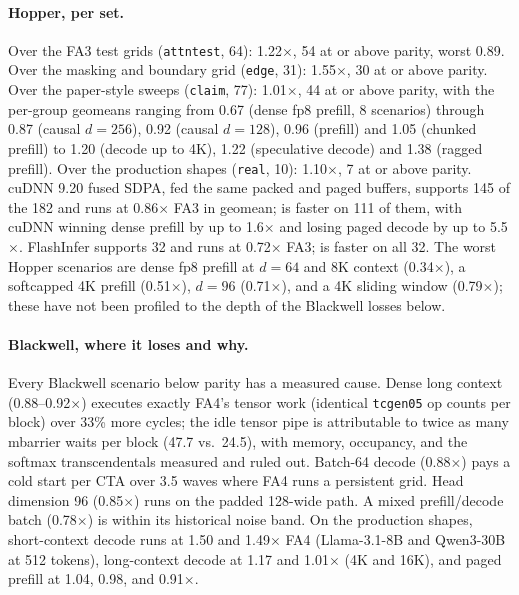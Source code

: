 \paragraph{Hopper, per set.} Over the FA3 test grids (\texttt{attntest}, 64): 1.22$\times$, 54 at
or above parity, worst 0.89. Over the masking and boundary grid (\texttt{edge}, 31): 1.55$\times$,
30 at or above parity. Over the paper-style sweeps (\texttt{claim}, 77): 1.01$\times$, 44 at or above
parity, with the per-group geomeans ranging from 0.67 (dense fp8 prefill, 8 scenarios) through 0.87
(causal $d=256$), 0.92 (causal $d=128$), 0.96 (prefill) and 1.05 (chunked prefill) to 1.20 (decode up
to 4K), 1.22 (speculative decode) and 1.38 (ragged prefill). Over the production shapes
(\texttt{real}, 10): 1.10$\times$, 7 at or above parity. cuDNN 9.20 fused SDPA, fed the same packed
and paged buffers, supports 145 of the 182 and runs at 0.86$\times$ FA3 in geomean; \ksFaThree is faster
on 111 of them, with cuDNN winning dense prefill by up to 1.6$\times$ and losing paged decode by up to
5.5$\times$. FlashInfer supports 32 and runs at 0.72$\times$ FA3; \ksFaThree is faster on all 32. The
worst Hopper scenarios are dense fp8 prefill at $d=64$ and 8K context (0.34$\times$), a softcapped
4K prefill (0.51$\times$), $d=96$ (0.71$\times$), and a 4K sliding window (0.79$\times$); these have
not been profiled to the depth of the Blackwell losses below.

\paragraph{Blackwell, where it loses and why.} Every Blackwell scenario below parity has a measured
cause. Dense long context (0.88--0.92$\times$) executes exactly FA4's tensor work (identical
\texttt{tcgen05} op counts per block) over 33\% more cycles; the idle tensor pipe is attributable to
twice as many mbarrier waits per block (47.7 vs.\ 24.5), with memory, occupancy, and the softmax
transcendentals measured and ruled out. Batch-64 decode (0.88$\times$) pays a cold start per CTA
over 3.5 waves where FA4 runs a persistent grid. Head dimension 96 (0.85$\times$) runs on the padded
128-wide path. A mixed prefill/decode batch (0.78$\times$) is within its historical noise band. On
the production shapes, short-context decode runs at 1.50 and 1.49$\times$ FA4 (Llama-3.1-8B and
Qwen3-30B at 512 tokens), long-context decode at 1.17 and 1.01$\times$ (4K and 16K), and paged
prefill at 1.04, 0.98, and 0.91$\times$.

